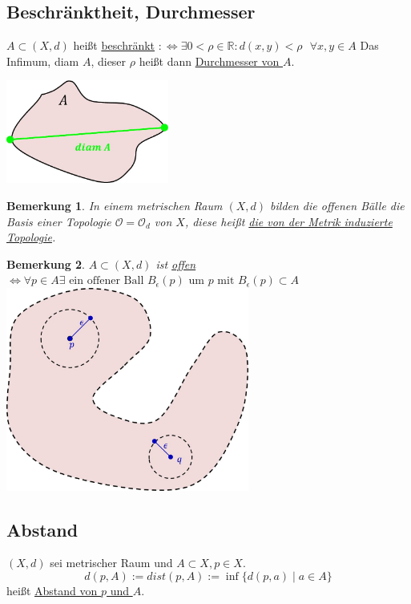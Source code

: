 \documentclass[a4paper,11pt,notitlepage]{report}
\newtheorem{remark}{Bemerkung}[chapter]
\newcommand{\R}{{\ensuremath{\mathbb{R}}}}
\newcommand{\OO}{{\ensuremath{\mathcal{O}}}}
\newenvironment{Kasten}[1]
{
\hspace{0.05\linewidth}
\begin{center}
\begin{minipage}{0.9\linewidth}
\setlength{\fboxsep}{10pt}
\definecolor{shadecolor}{gray}{1}
\definecolor{framecolor}{gray}{0}
\def\FrameCommand{\fcolorbox{framecolor}{shadecolor}}
\MakeFramed {\FrameRestore}
\subsection{#1}
\begin{itshape}
}
{
\end{itshape}
\endMakeFramed
\end{minipage}
\end{center}
}
\begin{document}
\begin{Kasten}{Beschränktheit, Durchmesser}
	$A \subset (X,d)$ heißt \underline{beschränkt} \newline $:\Leftrightarrow \exists 0 < \rho \in \R \colon d(x,y) < \rho  \text{   } \forall x,y \in A$
	\newline
	Das Infimum, diam $A$, dieser $\rho$ heißt dann \underline{Durchmesser von $A$}.
	\newline
\end{Kasten}
	\includegraphics[width=0.4\textwidth]{images/Durchmesser.jpg}
	
\begin{remark}
	In einem metrischen Raum $(X,d)$ bilden die offenen Bälle die Basis einer Topologie $\OO=\OO_d$ von $X$, diese heißt \underline{die von der Metrik induzierte Topologie}.
\end{remark}

\begin{remark}
	$A \subset (X,d)$ ist \underline{offen}
	\newline
	$\Leftrightarrow \forall p \in A \exists \text{ ein offener Ball } B_\epsilon(p) \text{ um } p \text{ mit } B_\epsilon(p) \subset A$
	\newline
	\includegraphics[width=0.6\textwidth]{images/metrisch_offen.jpg}
\end{remark}

\begin{Kasten}{Abstand}
	$(X,d)$ sei metrischer Raum und $A \subset X, p \in X$.
	$$d(p,A) := dist(p,A):= \inf \{d(p,a) \mid a\in A \}$$
	heißt \underline{Abstand von $p$ und $A$}.
\end{Kasten}
\end{document}
